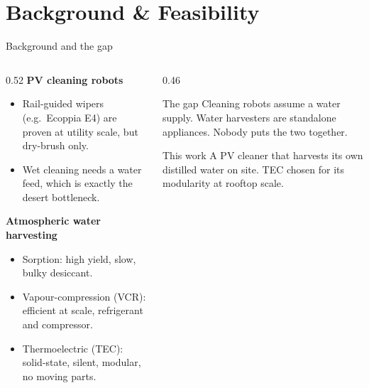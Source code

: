 \documentclass[aspectratio=169,10pt]{beamer}
\begin{document}
\section{Background \& Feasibility}
\begin{frame}{Background and the gap}
  \begin{columns}[T]
    \begin{column}{0.52\textwidth}
      \textbf{PV cleaning robots}
      \begin{itemize}\small
        \item Rail-guided wipers (e.g.\ Ecoppia E4) are proven at utility scale, but dry-brush only.
        \item Wet cleaning needs a water feed, which is exactly the desert bottleneck.
      \end{itemize}
      \vspace{0.5em}
      \textbf{Atmospheric water harvesting}
      \begin{itemize}\small
        \item Sorption: high yield, slow, bulky desiccant.
        \item Vapour-compression (VCR): efficient at scale, refrigerant and compressor.
        \item Thermoelectric (TEC): solid-state, silent, modular, no moving parts.
      \end{itemize}
    \end{column}
    \begin{column}{0.46\textwidth}
      \begin{block}{The gap}
        Cleaning robots assume a water supply. Water harvesters are standalone appliances. Nobody puts the two together.
      \end{block}
      \vspace{0.4em}
      \begin{block}{This work}
        A PV cleaner that harvests its own distilled water on site. TEC chosen for its modularity at rooftop scale.
      \end{block}
    \end{column}
  \end{columns}
\end{frame}
\end{document}
